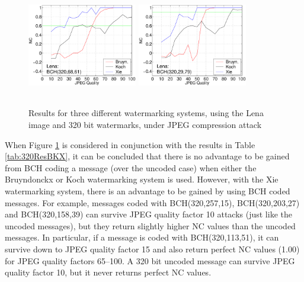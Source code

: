 \documentclass[12pt]{report}
\begin{document}
\begin{figure}[p]
{{        \includegraphics[height=4.6cm,width=4.8cm]{BKX_EPS_formattedBetter/Lena320_68_61.eps}
        \includegraphics[height=4.6cm,width=4.8cm]{BKX_EPS_formattedBetter/Lena320_29_79.eps}
}}
        \caption{Results for three different watermarking systems, using the Lena image and 320 bit 
	watermarks, under JPEG compression attack}
        \label{fig:320BKX}
\end{figure}

When Figure \ref{fig:320BKX} is
considered in conjunction with the results in Table \ref{tab:320ResBKX}, it can be concluded that there is no 
advantage to be gained from BCH coding a message (over the uncoded case) when either the Bruyndonckx or Koch
watermarking system is used. However, with the Xie watermarking system, there is an advantage to be gained by using 
BCH coded messages. For example, messages coded with  BCH(320,257,15), BCH(320,203,27) and BCH(320,158,39) can 
survive JPEG quality factor 10 attacks (just like the uncoded messages), but they return slightly higher NC values than the
uncoded messages. 
In particular, if a message is coded with BCH(320,113,51), it can survive down to JPEG quality factor 15 and also
return perfect NC values (1.00) for JPEG quality factors 65--100. A 320 bit uncoded message can survive JPEG quality factor 10,
but it never returns perfect NC values. 
\end{document}
